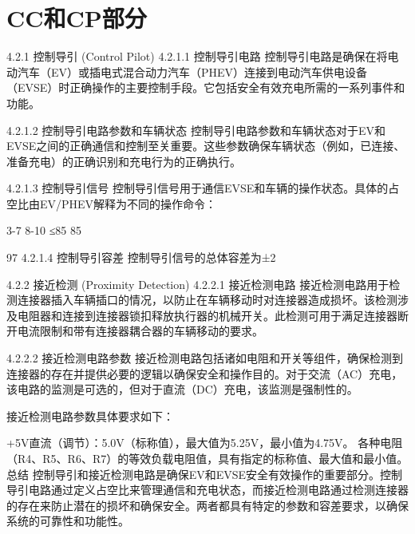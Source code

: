 
\section{CC和CP部分}

4.2.1 控制导引 (Control Pilot)
4.2.1.1 控制导引电路
控制导引电路是确保在将电动汽车（EV）或插电式混合动力汽车（PHEV）连接到电动汽车供电设备（EVSE）时正确操作的主要控制手段。它包括安全有效充电所需的一系列事件和功能。

4.2.1.2 控制导引电路参数和车辆状态
控制导引电路参数和车辆状态对于EV和EVSE之间的正确通信和控制至关重要。这些参数确保车辆状态（例如，已连接、准备充电）的正确识别和充电行为的正确执行。

4.2.1.3 控制导引信号
控制导引信号用于通信EVSE和车辆的操作状态。具体的占空比由EV/PHEV解释为不同的操作命令：

3-7%
8-10%
≤85%
85%

97%
4.2.1.4 控制导引容差
控制导引信号的总体容差为±2%

4.2.2 接近检测 (Proximity Detection)
4.2.2.1 接近检测电路
接近检测电路用于检测连接器插入车辆插口的情况，以防止在车辆移动时对连接器造成损坏。该检测涉及电阻器和连接到连接器锁扣释放执行器的机械开关。此检测可用于满足连接器断开电流限制和带有连接器耦合器的车辆移动的要求。

4.2.2.2 接近检测电路参数
接近检测电路包括诸如电阻和开关等组件，确保检测到连接器的存在并提供必要的逻辑以确保安全和操作目的。对于交流（AC）充电，该电路的监测是可选的，但对于直流（DC）充电，该监测是强制性的。

接近检测电路参数具体要求如下：

+5V直流（调节）：5.0V（标称值），最大值为5.25V，最小值为4.75V。
各种电阻（R4、R5、R6、R7）的等效负载电阻值，具有指定的标称值、最大值和最小值。
总结
控制导引和接近检测电路是确保EV和EVSE安全有效操作的重要部分。控制导引电路通过定义占空比来管理通信和充电状态，而接近检测电路通过检测连接器的存在来防止潜在的损坏和确保安全。两者都具有特定的参数和容差要求，以确保系统的可靠性和功能性。
      
